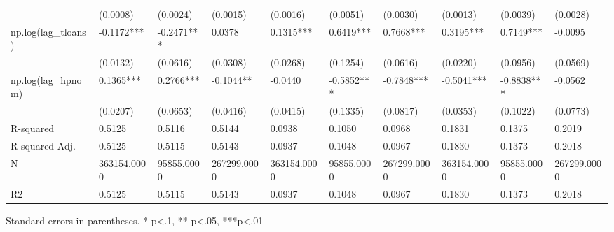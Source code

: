 \begin{table}
\begin{center}
\begin{tabular}{llllllllll}
                         & (0.0008)               & (0.0024)                & (0.0015)                 & (0.0016)                    & (0.0051)                     & (0.0030)                      & (0.0013)                   & (0.0039)                    & (0.0028)                      \\
np.log(lag\_tloans)      & -0.1172***             & -0.2471***              & 0.0378                   & 0.1315***                   & 0.6419***                    & 0.7668***                     & 0.3195***                  & 0.7149***                   & -0.0095                       \\
                         & (0.0132)               & (0.0616)                & (0.0308)                 & (0.0268)                    & (0.1254)                     & (0.0616)                      & (0.0220)                   & (0.0956)                    & (0.0569)                      \\
np.log(lag\_hpnom)       & 0.1365***              & 0.2766***               & -0.1044**                & -0.0440                     & -0.5852***                   & -0.7848***                    & -0.5041***                 & -0.8838***                  & -0.0562                       \\
                         & (0.0207)               & (0.0653)                & (0.0416)                 & (0.0415)                    & (0.1335)                     & (0.0817)                      & (0.0353)                   & (0.1022)                    & (0.0773)                      \\
R-squared                & 0.5125                 & 0.5116                  & 0.5144                   & 0.0938                      & 0.1050                       & 0.0968                        & 0.1831                     & 0.1375                      & 0.2019                        \\
R-squared Adj.           & 0.5125                 & 0.5115                  & 0.5143                   & 0.0937                      & 0.1048                       & 0.0967                        & 0.1830                     & 0.1373                      & 0.2018                        \\
N                        & 363154.0000            & 95855.0000              & 267299.0000              & 363154.0000                 & 95855.0000                   & 267299.0000                   & 363154.0000                & 95855.0000                  & 267299.0000                   \\
R2                       & 0.5125                 & 0.5115                  & 0.5143                   & 0.0937                      & 0.1048                       & 0.0967                        & 0.1830                     & 0.1373                      & 0.2018                        \\
\hline
\end{tabular}
\end{center}
\end{table}
\bigskip
Standard errors in parentheses. \newline 
* p<.1, ** p<.05, ***p<.01
